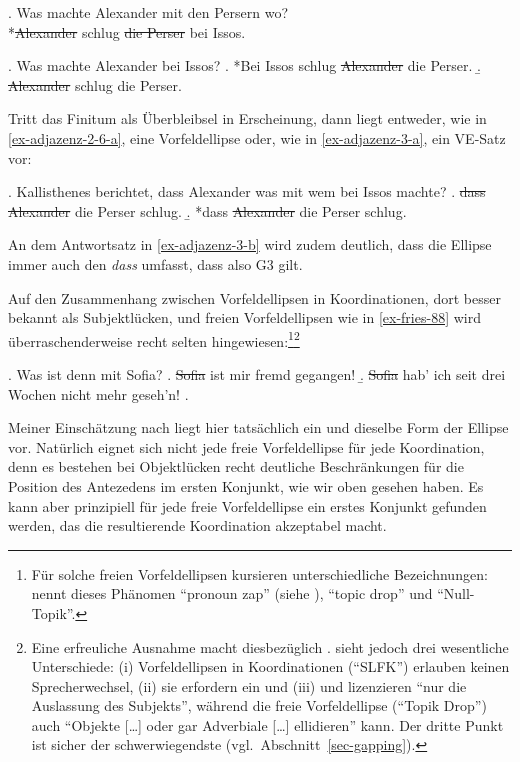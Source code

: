 \ex. \label{ex-adjazenz-2-8} Was machte Alexander mit den Persern wo? \\
*\sout{Alexander} schlug \sout{die Perser}  bei Issos.

\ex. \label{ex-adjazenz-2-6} Was machte Alexander bei Issos? 
\a.  *Bei Issos schlug \sout{Alexander} die Perser.\label{ex-adjazenz-2-6-b}
\b.  \sout{Alexander} schlug die Perser.\label{ex-adjazenz-2-6-a}

Tritt das Finitum als Überbleibsel in Erscheinung, dann liegt entweder, wie in \ref{ex-adjazenz-2-6-a}, eine Vorfeldellipse oder, wie in  \ref{ex-adjazenz-3-a}, ein VE-Satz vor:

\ex. \label{ex-adjazenz-3}Kallisthenes berichtet, dass Alexander was mit wem bei Issos machte?
\a. \sout{dass Alexander} die Perser schlug.\label{ex-adjazenz-3-a}
\b. *dass \sout{Alexander} die Perser schlug.\label{ex-adjazenz-3-b}

An dem Antwortsatz in \ref{ex-adjazenz-3-b} wird zudem deutlich, dass die Ellipse immer auch den  {\it dass} umfasst, dass also G3 gilt.

Auf den Zusammenhang zwischen Vorfeldellipsen in Koordinationen, dort besser bekannt als Subjektlücken, und freien Vorfeldellipsen wie in \ref{ex-fries-88} wird überraschenderweise recht selten hingewiesen:\footnote{Für solche freien Vorfeldellipsen kursieren unterschiedliche Bezeichnungen: \cite{Ross:82} nennt dieses Phänomen "`pronoun zap"' (siehe \citealt{Huang:84}), \cite{Oirsouw:87} "`topic drop"' und \cite{Fries:88} "`Null-Topik"'.}\footnote{Eine erfreuliche Ausnahme macht diesbezüglich \citet[136ff]{Oirsouw:87}. \citet[153]{Reich:09} sieht jedoch drei wesentliche Unterschiede: (i) Vorfeldellipsen in Koordinationen ("`SLFK"') erlauben keinen Sprecherwechsel, (ii) sie erfordern ein  und (iii) und lizenzieren "`nur die Auslassung des Subjekts"', während die freie Vorfeldellipse ("`Topik Drop"') auch "`Objekte [\ldots] oder gar Adverbiale [\ldots] ellidieren"' kann. Der dritte Punkt ist sicher der schwerwiegendste (vgl.\ Abschnitt~\ref{sec-gapping}).}  

\newpage
\ex. \label{ex-fries-88}Was ist denn mit Sofia?
\a. \sout{Sofia} ist mir fremd gegangen!
\b. \sout{Sofia} hab' ich seit drei Wochen nicht mehr geseh'n!
\z. \citep[(1)--(3)]{Fries:88} 

Meiner Einschätzung nach liegt hier tatsächlich ein und dieselbe Form der Ellipse vor. Natürlich eignet sich nicht jede freie Vorfeldellipse für jede Koordination, denn es bestehen bei Objektlücken recht deutliche Beschränkungen für die Position des  Antezedens im ersten Konjunkt, wie wir oben gesehen haben. Es kann aber prinzipiell für jede freie Vorfeldellipse ein erstes Konjunkt gefunden werden, das die resultierende Koordination akzeptabel macht.  

